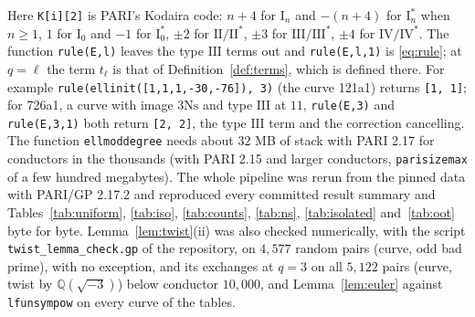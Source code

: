 \documentclass[11pt]{amsart}
\theoremstyle{definition}
\newcommand{\Q}{\mathbb{Q}}
\newcommand{\Ns}{3\mathrm{Ns}}
\begin{document}
Here \texttt{K[i][2]} is PARI's Kodaira code: $n+4$ for $\mathrm{I}_n$ and $-(n+4)$ for $\mathrm{I}_n^*$ when $n\ge1$, $1$ for $\mathrm{I}_0$ and $-1$ for $\mathrm{I}_0^*$, $\pm2$ for $\mathrm{II}/\mathrm{II}^*$, $\pm3$ for $\mathrm{III}/\mathrm{III}^*$, $\pm4$ for $\mathrm{IV}/\mathrm{IV}^*$. The function \texttt{rule(E,l)} leaves the type $\mathrm{III}$ terms out and \texttt{rule(E,l,1)} is \eqref{eq:rule}; at $q=\ell$ the term $t_\ell$ is that of Definition~\ref{def:terms}, which is defined there. For example \texttt{rule(ellinit([1,1,1,-30,-76]), 3)} (the curve 121a1) returns \texttt{[1, 1]}; for 726a1, a curve with image $\Ns$ and type $\mathrm{III}$ at $11$, \texttt{rule(E,3)} and \texttt{rule(E,3,1)} both return \texttt{[2, 2]}, the type $\mathrm{III}$ term and the correction cancelling. The function \texttt{ellmoddegree} needs about $32$ MB of stack with PARI 2.17 for conductors in the thousands (with PARI 2.15 and larger conductors, \texttt{parisizemax} of a few hundred megabytes). The whole pipeline was rerun from the pinned data with PARI/GP 2.17.2 and reproduced every committed result summary and Tables~\ref{tab:uniform}, \ref{tab:iso}, \ref{tab:counts}, \ref{tab:ns}, \ref{tab:isolated} and~\ref{tab:oot} byte for byte. Lemma~\ref{lem:twist}(ii) was also checked numerically, with the script \texttt{twist\_lemma\_check.gp} of the repository, on $4{,}577$ random pairs (curve, odd bad prime), with no exception, and its exchanges at $q=3$ on all $5{,}122$ pairs (curve, twist by $\Q(\sqrt{-3})$) below conductor $10{,}000$, and Lemma~\ref{lem:euler} against \texttt{lfunsympow} on every curve of the tables.
\end{document}
